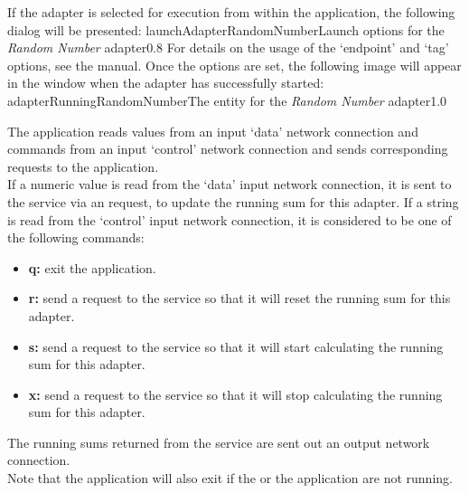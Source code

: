 \insertStandardAdapterCommands{}
If the adapter is selected for execution from within the \emph{\MMMU} application, the
following dialog will be presented:
%
{launchAdapterRandomNumber}{Launch options for the \emph{Random Number} adapter}{0.8}
\condPage{}
For details on the usage of the `endpoint' and `tag' options, see the \emph{\MMMU} manual.
Once the options are set, the following image will appear in the \emph{\MMMU} window when
the adapter has successfully started:
%
{adapterRunningRandomNumber}{The \emph{\MMMU} entity for the \emph{Random Number}
adapter}{1.0}

The  application reads  values from an input
`data' \yarp{} network connection and commands from an input `control' \yarp{} network
connection and sends corresponding requests to the
 application.\\

If a numeric value is read from the `data' input \yarp{} network connection, it is sent to
the service via an  request, to update the
running sum for this adapter.
If a string is read from the `control' input \yarp{} network connection, it is considered
to be one of the following commands:
\begin{itemize}
\item\textbf{q:} exit the application.
\item\exSp\textbf{r:} send a  request to the
service so that it will reset the running sum for this adapter.
\item\exSp\textbf{s:} send a  request to the
service so that it will start calculating the running sum for this adapter.
\item\exSp\textbf{x:} send a  request to the
service so that it will stop calculating the running sum for this adapter.
\end{itemize}
The running sums returned from the service are sent out an output \yarp{} network
connection.\\

Note that the application will also exit if the  or the
 application are not running.\\

